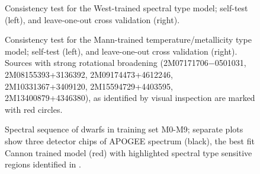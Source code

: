 \documentclass[modern]{aastex62}
\begin{document}

\newpage

\begin{figure}[ht]
\begin{center}
\end{center}
\caption{Consistency test for the West-trained spectral type model; self-test (left), and leave-one-out cross validation (right).} \label{fig:west_validation}
\end{figure}

\begin{figure}[ht]
\caption{Consistency test for the Mann-trained temperature/metallicity type model; self-test (left), and leave-one-out cross validation (right). Sources with strong rotational broadening (2M07171706−0501031, 2M08155393+3136392, 2M09174473+4612246, 2M10331367+3409120, 2M15594729+4403595, 2M13400879+4346380), as identified by visual inspection are marked with red circles.} \label{fig:mann_validation}
\end{figure}

\begin{figure}[ht]
\caption{Spectral sequence of dwarfs in training set M0-M9; separate plots show three detector chips of APOGEE spectrum (black), the best fit Cannon trained model (red) with highlighted spectral type sensitive regions identified in \citealt{Desphande:2013}.} \label{fig:sp_sequence}
\end{figure}
\end{document}
